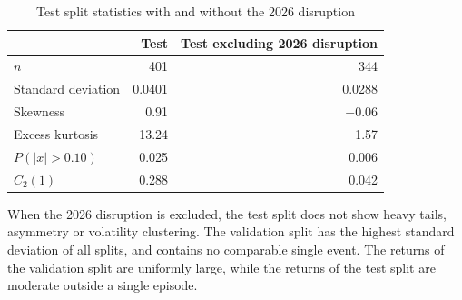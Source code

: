 \begin{table}[htbp]
\centering
\begin{tabular}{lrr}
\toprule
 & Test & Test excluding 2026 disruption \\
\midrule
$n$                & 401     & 344 \\
Standard deviation &  0.0401 &  0.0288 \\
Skewness           &  0.91   & $-$0.06 \\
Excess kurtosis    & 13.24   &  1.57 \\
$P(|x| > 0.10)$    &  0.025  &  0.006 \\
$C_2(1)$           &  0.288  &  0.042 \\
\bottomrule
\end{tabular}
\caption{Test split statistics with and without the 2026 disruption}
\label{tab:test-spike}
\end{table}
 

When the 2026 disruption is excluded, the test split does not show heavy tails, asymmetry or volatility clustering. The validation split has the highest standard deviation of all splits, and contains no comparable single event. The returns of the validation split are uniformly large, while the returns of the test split are moderate outside a single episode.